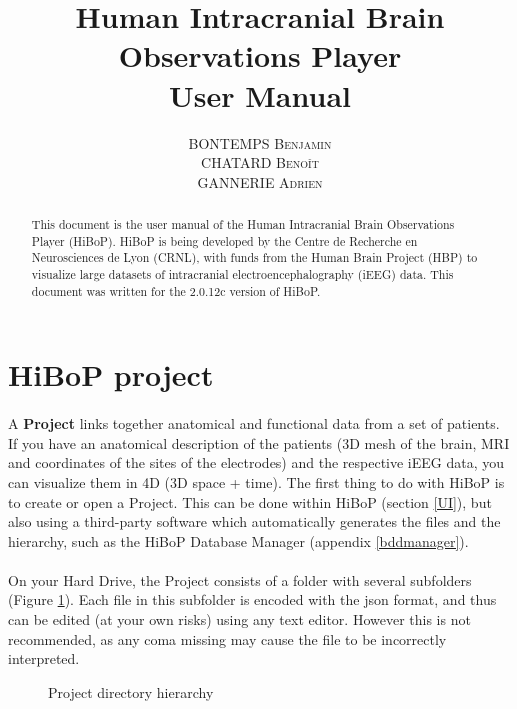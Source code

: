 \documentclass[a4paper]{article}
\title{Human Intracranial Brain Observations Player \\ User Manual}
\author{\textsc{BONTEMPS Benjamin} \\ \textsc{CHATARD Benoît} \\ \textsc{GANNERIE Adrien}}
\begin{document}
\maketitle
\begin{abstract}
This document is the user manual of the Human Intracranial Brain Observations Player (HiBoP). HiBoP is being developed by the Centre de Recherche en Neurosciences de Lyon (CRNL), with funds from the Human Brain Project (HBP) to visualize large datasets of intracranial electroencephalography (iEEG) data. This document was written for the 2.0.12c version of HiBoP.
\end{abstract}
\tableofcontents
\section{HiBoP project} \label{data}
\paragraph{} A \textbf{Project} links together anatomical and functional data from a set of patients. If you have an anatomical description of the patients (3D mesh of the brain, MRI and coordinates of the sites of the electrodes) and the respective iEEG data, you can visualize them in 4D (3D space + time). The first thing to do with HiBoP is to create or open a Project. This can be done within HiBoP (section \ref{UI}), but also using a third-party software which automatically generates the files and the hierarchy, such as the HiBoP Database Manager (appendix \ref{bddmanager}).
\paragraph{} On your Hard Drive, the Project consists of a folder with several subfolders (Figure \ref{projectDirectory}). Each file in this subfolder is encoded with the json format, and thus can be edited (at your own risks) using any text editor. However this is not recommended, as any coma missing may cause the file to be incorrectly interpreted.
\begin{figure}[H]
\caption{\label{projectDirectory}Project directory hierarchy}
\end{figure}
\end{document}
